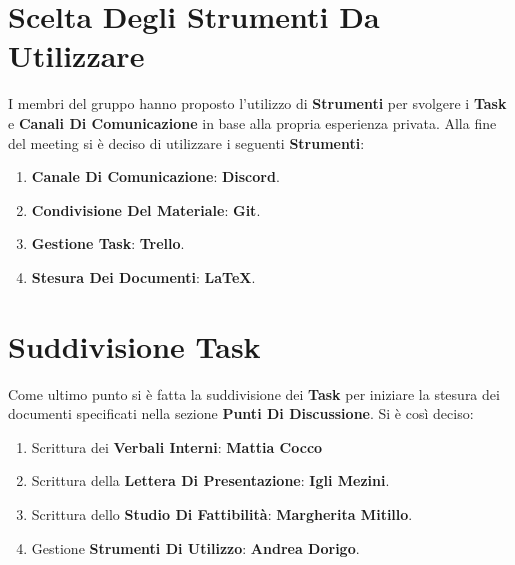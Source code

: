 \documentclass[a4paper,12pt]{report}
\begin{document}
	\chapter{Scelta Degli Strumenti Da Utilizzare}
	I membri del gruppo hanno proposto l'utilizzo di \textbf{Strumenti} per svolgere i \textbf{Task} e \textbf{Canali Di Comunicazione} in base alla propria esperienza privata.
	Alla fine del meeting si è deciso di utilizzare i seguenti \textbf{Strumenti}:
	\begin{enumerate}
		\item \textbf{Canale Di Comunicazione}: \textbf{Discord}.
		\item \textbf{Condivisione Del Materiale}: \textbf{Git}.
		\item \textbf{Gestione Task}: \textbf{Trello}.
		\item \textbf{Stesura Dei Documenti}: \textbf{LaTeX}.
	\end{enumerate}
	 
	\chapter{Suddivisione Task}
	Come ultimo punto si è fatta la suddivisione dei \textbf{Task} per iniziare la stesura dei documenti specificati nella sezione \textbf{Punti Di Discussione}.
	Si è così deciso:
	\begin{enumerate}
		\item Scrittura dei \textbf{Verbali Interni}: \textbf{Mattia Cocco}
		\item Scrittura della \textbf{Lettera Di Presentazione}: \textbf{Igli Mezini}.
		\item Scrittura dello \textbf{Studio Di Fattibilità}: \textbf{Margherita Mitillo}.
		\item Gestione \textbf{Strumenti Di Utilizzo}: \textbf{Andrea Dorigo}.
	\end{enumerate}
\end{document}

